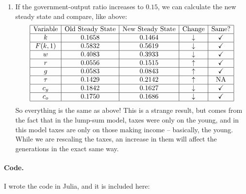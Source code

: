 \documentclass[10pt]{article}
\begin{document}
\begin{enumerate}
	\item If the government-output ratio increases to $0.15$, we can calculate the new steady state and compare, like above:\[ \begin{array}{|c|c|c|c|c|} \hline \text{Variable} &\text{Old Steady State} & \text{New Steady State} & \text{Change} & \text{Same?} \\\hline k & 0.1658 & 0.1464 & \downarrow & \checkmark \\\hline F(k,1) & 0.5832 & 0.5619& \downarrow & \checkmark \\\hline w & 0.4083 & 0.3933& \downarrow& \checkmark \\\hline r & 0.0556 & 0.1515& \uparrow& \checkmark \\\hline g & 0.0583 & 0.0843& \uparrow& \checkmark \\\hline \tau & 0.1429 & 0.2142& \uparrow & \text{NA} \\\hline c_y & 0.1842 & 0.1627 & \downarrow & \checkmark \\\hline c_o & 0.1750 & 0.1686 & \downarrow & \checkmark\\\hline \end{array}\]So everything is the same as above! This is a strange result, but comes from the fact that in the lump-sum model, taxes were only on the young, and in this model taxes are only on those making income -- basically, the young. While we are rescaling the taxes, an increase in them will affect the generations in the exact same way.
\end{enumerate}



\paragraph{Code.} I wrote the code in Julia, and it is included here:


\end{document}
